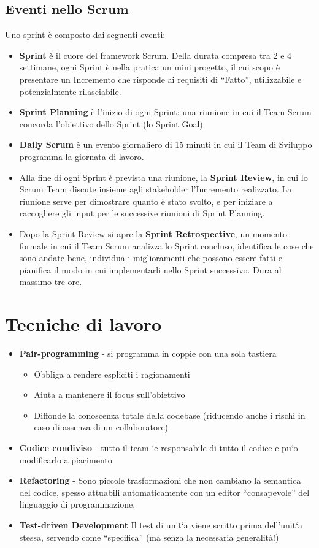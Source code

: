 \documentclass[a4paper,12pt,titlepage,oneside]{book}
\begin{document}
\subsection{Eventi nello Scrum}
    Uno sprint è composto dai seguenti eventi:
\begin{itemize}
    \item \textbf{Sprint} è il cuore del framework Scrum. Della durata compresa tra 2 e 4 settimane, ogni Sprint è nella pratica un mini progetto, il cui scopo è presentare un Incremento che risponde ai requisiti di “Fatto”, utilizzabile e potenzialmente rilasciabile.
    \item \textbf{Sprint Planning} è l’inizio di ogni Sprint: una riunione in cui il Team Scrum concorda l’obiettivo dello Sprint (lo Sprint Goal)
    \item \textbf{Daily Scrum} è un evento giornaliero di 15 minuti in cui il Team di Sviluppo programma la giornata di lavoro.
    \item Alla fine di ogni Sprint è prevista una riunione, la \textbf{Sprint Review}, in cui lo Scrum Team discute insieme agli stakeholder l’Incremento realizzato. La riunione serve per dimostrare quanto è stato svolto, e per iniziare a raccogliere gli input per le successive riunioni di Sprint Planning. 
    \item Dopo la Sprint Review si apre la \textbf{Sprint Retrospective}, un momento formale in cui il Team Scrum analizza lo Sprint concluso, identifica le cose che sono andate bene, individua i miglioramenti che possono essere fatti e pianifica il modo in cui implementarli nello Sprint successivo. Dura al massimo tre ore.
\end{itemize}

\section{Tecniche di lavoro}

\begin{itemize}
    \item \textbf{Pair-programming} - si programma in coppie con una sola tastiera
    \begin{itemize}
        \item Obbliga a rendere espliciti i ragionamenti
        \item Aiuta a mantenere il focus sull’obiettivo
        \item Diffonde la conoscenza totale della codebase (riducendo anche i rischi in caso di assenza di un collaboratore)
    \end{itemize}
    \item \textbf{Codice condiviso} - tutto il team `e responsabile di tutto il codice e pu`o modificarlo a piacimento
    \item \textbf{Refactoring} - Sono piccole trasformazioni che non cambiano la semantica del codice, spesso attuabili automaticamente con un editor “consapevole” del linguaggio di programmazione.
    \item \textbf{Test-driven Development} Il test di unit`a viene scritto prima dell’unit`a stessa, servendo come “specifica” (ma senza la necessaria generalità!)
\end{itemize}
\end{document}
